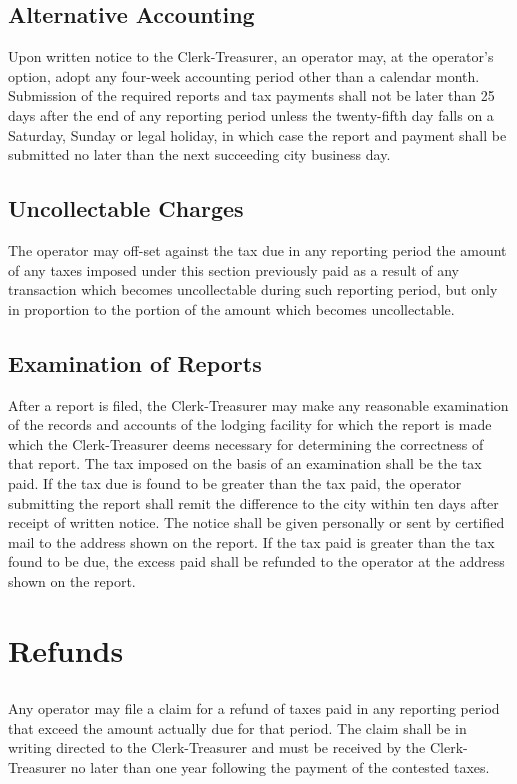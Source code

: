 \subsection{Alternative Accounting}
Upon written notice to the Clerk-Treasurer, an operator may, at the operator’s option, adopt any four-week accounting period other than a calendar month.  Submission of the required reports and tax payments shall not be later than 25 days after the end of any reporting period unless the twenty-fifth day falls on a Saturday, Sunday or legal holiday, in which case the report and payment shall be submitted no later than the next succeeding city business day.
\subsection{Uncollectable Charges}
The operator may off-set against the tax due in any reporting period the amount of any taxes imposed under this section previously paid as a result of any transaction which becomes uncollectable during such reporting period, but only in proportion to the portion of the amount which becomes uncollectable.
\subsection{Examination of Reports}
After a report is filed, the Clerk-Treasurer may make any reasonable examination of the records and accounts of the lodging facility for which the report is made which the Clerk-Treasurer deems necessary for determining the correctness of that report. The tax imposed on the basis of an examination shall be the tax paid. If the tax due is found to be greater than the tax paid, the operator submitting the report shall remit the difference to the city within ten days after receipt of written notice. The notice shall be given personally or sent by certified mail to the address shown on the report. If the tax paid is greater than the tax found to be due, the excess paid shall be refunded to the operator at the address shown on the report.

\section{Refunds}
\subsection{}
Any operator may file a claim for a refund of taxes paid in any reporting period that exceed the amount actually due for that period. The claim shall be in writing directed to the Clerk-Treasurer and must be received by the Clerk-Treasurer no later than one year following the payment of the contested taxes.
